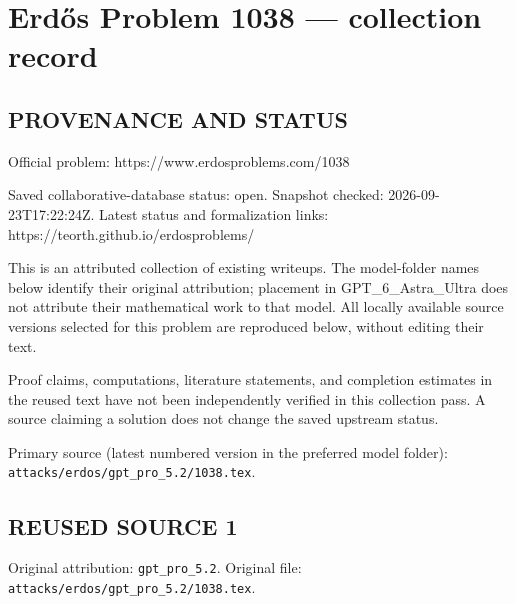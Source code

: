 \section*{Erd\H{o}s Problem 1038 --- collection record}

\subsection*{PROVENANCE AND STATUS}
Official problem: https://www.erdosproblems.com/1038

Saved collaborative-database status: open.
Snapshot checked: 2026-09-23T17:22:24Z.
Latest status and formalization links: https://teorth.github.io/erdosproblems/

This is an attributed collection of existing writeups. The model-folder names below identify their original attribution; placement in GPT\_6\_Astra\_Ultra does not attribute their mathematical work to that model. All locally available source versions selected for this problem are reproduced below, without editing their text.

Proof claims, computations, literature statements, and completion estimates in the reused text have not been independently verified in this collection pass. A source claiming a solution does not change the saved upstream status.

Primary source (latest numbered version in the preferred model folder): \texttt{attacks/erdos/gpt\_pro\_5.2/1038.tex}.

\subsection*{REUSED SOURCE 1}
Original attribution: \texttt{gpt\_pro\_5.2}.
Original file: \texttt{attacks/erdos/gpt\_pro\_5.2/1038.tex}.



